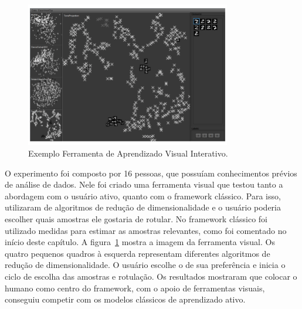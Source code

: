 \begin{figure}
  \centering
  \includegraphics[width=0.8\textwidth]{figures/visual_comparing.png}
  \caption{Exemplo Ferramenta de Aprendizado Visual Interativo.}
  \label{fig:visual_comparing}
\end{figure}


O experimento foi composto por 16 pessoas, que possuíam conhecimentos prévios de análise de dados. Nele foi criado uma ferramenta visual que testou tanto a abordagem com o usuário ativo, quanto com o framework clássico. Para isso, utilizaram de algoritmos de redução de dimensionalidade e o usuário poderia escolher quais amostras ele gostaria de rotular. No framework clássico foi utilizado medidas para estimar as amostras relevantes, como foi comentado no início deste capítulo. A figura~\ref{fig:visual_comparing} mostra a imagem da ferramenta visual. Os quatro pequenos quadros à esquerda representam diferentes algoritmos de redução de dimensionalidade. O usuário escolhe o de sua preferência e inicia o ciclo de escolha das amostras e rotulação. Os resultados mostraram que colocar o humano como centro do framework, com o apoio de ferramentas visuais, conseguiu competir com os modelos clássicos de aprendizado ativo. 











